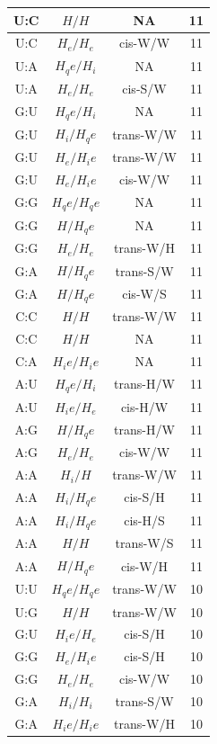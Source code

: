 \begin{center}
\begin{longtable}{c|c|c|c}
U:C & $H/H$ & NA & 11 \\  \hline
U:C & $H_e/H_e$ & cis-W/W & 11 \\  \hline
U:A & $H_qe/H_i$ & NA & 11 \\  \hline
U:A & $H_e/H_e$ & cis-S/W & 11 \\  \hline
G:U & $H_qe/H_i$ & NA & 11 \\  \hline
G:U & $H_i/H_qe$ & trans-W/W & 11 \\  \hline
G:U & $H_e/H_ie$ & trans-W/W & 11 \\  \hline
G:U & $H_e/H_ie$ & cis-W/W & 11 \\  \hline
G:G & $H_qe/H_qe$ & NA & 11 \\  \hline
G:G & $H/H_qe$ & NA & 11 \\  \hline
G:G & $H_e/H_e$ & trans-W/H & 11 \\  \hline
G:A & $H/H_qe$ & trans-S/W & 11 \\  \hline
G:A & $H/H_qe$ & cis-W/S & 11 \\  \hline
C:C & $H/H$ & trans-W/W & 11 \\  \hline
C:C & $H/H$ & NA & 11 \\  \hline
C:A & $H_ie/H_ie$ & NA & 11 \\  \hline
A:U & $H_qe/H_i$ & trans-H/W & 11 \\  \hline
A:U & $H_ie/H_e$ & cis-H/W & 11 \\  \hline
A:G & $H/H_qe$ & trans-H/W & 11 \\  \hline
A:G & $H_e/H_e$ & cis-W/W & 11 \\  \hline
A:A & $H_i/H$ & trans-W/W & 11 \\  \hline
A:A & $H_i/H_qe$ & cis-S/H & 11 \\  \hline
A:A & $H_i/H_qe$ & cis-H/S & 11 \\  \hline
A:A & $H/H$ & trans-W/S & 11 \\  \hline
A:A & $H/H_qe$ & cis-W/H & 11 \\  \hline
U:U & $H_qe/H_qe$ & trans-W/W & 10 \\  \hline
U:G & $H/H$ & trans-W/W & 10 \\  \hline
G:U & $H_ie/H_e$ & cis-S/H & 10 \\  \hline
G:G & $H_e/H_ie$ & cis-S/H & 10 \\  \hline
G:G & $H_e/H_e$ & cis-W/W & 10 \\  \hline
G:A & $H_i/H_i$ & trans-S/W & 10 \\  \hline
G:A & $H_ie/H_ie$ & trans-W/H & 10 \\  \hline

\end{longtable}
\end{center}
